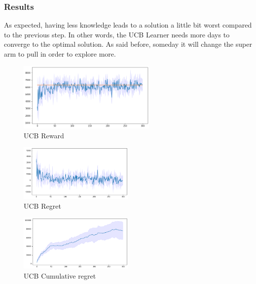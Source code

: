 \subsubsection{Results}
As expected, having less knowledge leads to a solution a little bit worst compared to the previous step. In other words, the UCB Learner needs more days to converge to the optimal solution. As said before, someday it will change the super arm to pull in order to explore more.
\begin{figure}[ht]
    \begin{center}
    \includegraphics[width=0.6\textwidth]{img/UCB4.png}
    \caption{UCB Reward}
    \label{fig:reward41}
    \end{center}
\end{figure}
\begin{multicols}{2}
    \begin{figure}[H]
        \begin{center}
        \includegraphics[width=0.5\textwidth]{img/UCB4_regret.png}
        \caption{UCB Regret}
        \label{fig:regret41}
        \end{center}
    \end{figure}
    \columnbreak
    \begin{figure}[H]
        \begin{center}
        \includegraphics[width=0.5\textwidth]{img/UCB4_cum_reg.png}
        \caption{UCB Cumulative regret}
        \label{fig:cum_reg41}
        \end{center}
    \end{figure}
\end{multicols}

